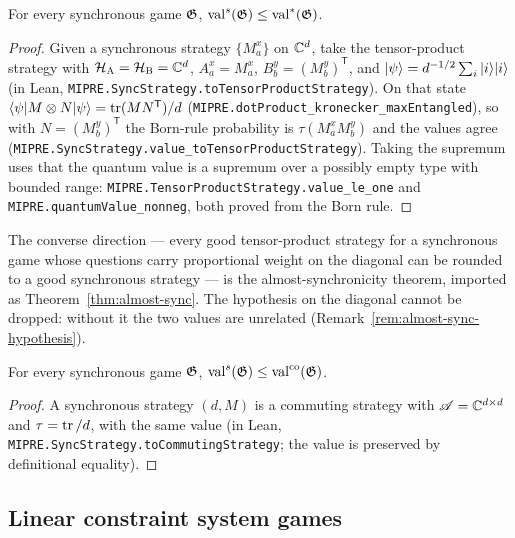 \begin{lemma}
\label{lem:sync-le-valstar}
\leanok
\qlib{}
For every synchronous game $\mathfrak{G}$, $\mathrm{val}^{s}(\mathfrak{G}) \leq \mathrm{val}^*(\mathfrak{G})$.
\end{lemma}
\begin{proof}
\leanok
Given a synchronous strategy $\{M^x_a\}$ on $\mathbb{C}^d$, take the tensor-product strategy
with $\mathcal{H}_{\textsc{A}} = \mathcal{H}_{\textsc{B}} = \mathbb{C}^d$, $A^x_a = M^x_a$, $B^y_b = (M^y_b)^{\mathsf{T}}$,
and $|\psi\rangle = d^{-1/2}\sum_i |i\rangle|i\rangle$ (in Lean,
\texttt{MIPRE.SyncStrategy.toTensorProductStrategy}). On that state
$\langle\psi| M \otimes N |\psi\rangle = \operatorname{tr}(M N^{\mathsf{T}})/d$
(\texttt{MIPRE.dotProduct\_kronecker\_maxEntangled}), so with $N = (M^y_b)^{\mathsf{T}}$ the
Born-rule probability is $\tau(M^x_a M^y_b)$ and the values agree
(\texttt{MIPRE.SyncStrategy.value\_toTensorProductStrategy}). Taking the supremum uses that
the quantum value is a supremum over a possibly empty type with bounded range:
\texttt{MIPRE.TensorProductStrategy.value\_le\_one} and
\texttt{MIPRE.quantumValue\_nonneg}, both proved from the Born rule.
\end{proof}

The converse direction --- every good tensor-product strategy for a synchronous game
whose questions carry proportional weight on the diagonal can be rounded to a good
synchronous strategy --- is the almost-synchronicity theorem, imported as
Theorem~\ref{thm:almost-sync}. The hypothesis on the diagonal cannot be dropped: without
it the two values are unrelated (Remark~\ref{rem:almost-sync-hypothesis}).

\begin{lemma}
\label{lem:sync-le-valco}
\leanok
\qlib{}
For every synchronous game $\mathfrak{G}$, $\mathrm{val}^{s}(\mathfrak{G}) \leq \mathrm{val}^{\mathrm{co}}(\mathfrak{G})$.
\end{lemma}
\begin{proof}
\leanok
A synchronous strategy $(d, M)$ is a commuting strategy with $\mathscr{A} = \mathbb{C}^{d \times d}$
and $\tau = \operatorname{tr}/d$, with the same value (in Lean,
\texttt{MIPRE.SyncStrategy.toCommutingStrategy}; the value is preserved by
definitional equality).
\end{proof}

\subsection{Linear constraint system games}
\label{sec:lcs-games}

